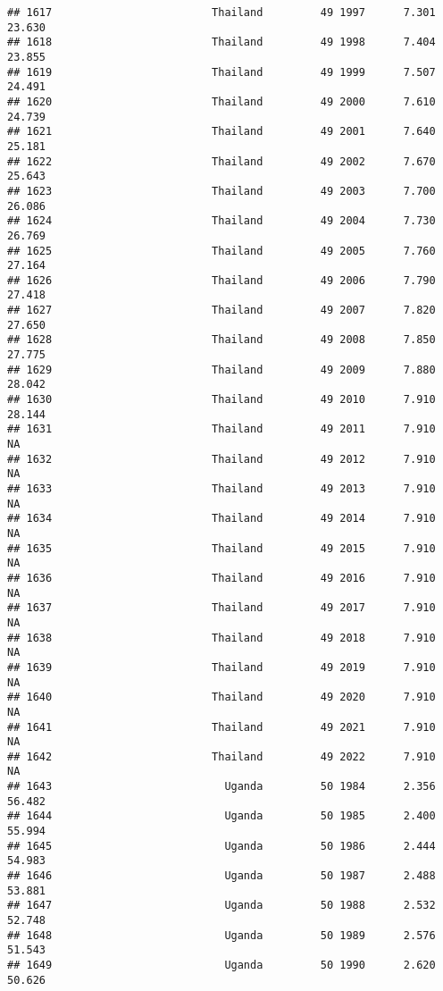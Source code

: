 \documentclass[
]{article}
\begin{document}
\begin{verbatim}
## 1617                         Thailand         49 1997      7.301     23.630
## 1618                         Thailand         49 1998      7.404     23.855
## 1619                         Thailand         49 1999      7.507     24.491
## 1620                         Thailand         49 2000      7.610     24.739
## 1621                         Thailand         49 2001      7.640     25.181
## 1622                         Thailand         49 2002      7.670     25.643
## 1623                         Thailand         49 2003      7.700     26.086
## 1624                         Thailand         49 2004      7.730     26.769
## 1625                         Thailand         49 2005      7.760     27.164
## 1626                         Thailand         49 2006      7.790     27.418
## 1627                         Thailand         49 2007      7.820     27.650
## 1628                         Thailand         49 2008      7.850     27.775
## 1629                         Thailand         49 2009      7.880     28.042
## 1630                         Thailand         49 2010      7.910     28.144
## 1631                         Thailand         49 2011      7.910         NA
## 1632                         Thailand         49 2012      7.910         NA
## 1633                         Thailand         49 2013      7.910         NA
## 1634                         Thailand         49 2014      7.910         NA
## 1635                         Thailand         49 2015      7.910         NA
## 1636                         Thailand         49 2016      7.910         NA
## 1637                         Thailand         49 2017      7.910         NA
## 1638                         Thailand         49 2018      7.910         NA
## 1639                         Thailand         49 2019      7.910         NA
## 1640                         Thailand         49 2020      7.910         NA
## 1641                         Thailand         49 2021      7.910         NA
## 1642                         Thailand         49 2022      7.910         NA
## 1643                           Uganda         50 1984      2.356     56.482
## 1644                           Uganda         50 1985      2.400     55.994
## 1645                           Uganda         50 1986      2.444     54.983
## 1646                           Uganda         50 1987      2.488     53.881
## 1647                           Uganda         50 1988      2.532     52.748
## 1648                           Uganda         50 1989      2.576     51.543
## 1649                           Uganda         50 1990      2.620     50.626

\end{verbatim}
\end{document}
